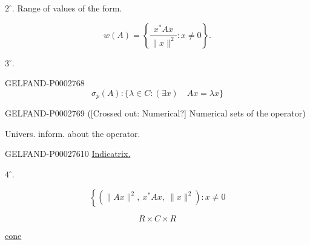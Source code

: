 \par\noindent\begin{minipage}{\linewidth}
$2^{\circ}$. Range of values of the form.

\begin{equation*}w (A)=\left\{\frac{x^*Ax}{\|x\|^2}: x\ne0\right\}.\end{equation*}
\end{minipage}

$3^{\circ}$.

\begin{GelfandAdjacentEvidence}{GELFAND-P000276}{8}
\begin{equation*}\sigma_p (A):\{\lambda\in C: (\exists x)\quad Ax=\lambda x\}\end{equation*}

\end{GelfandAdjacentEvidence}


\begin{GelfandAdjacentEvidence}{GELFAND-P000276}{9}
([Crossed out: Numerical?] Numerical sets of the operator)

\end{GelfandAdjacentEvidence}


Univers. inform. about the operator.

\begin{GelfandAdjacentEvidence}{GELFAND-P000276}{10}
\underline{Indicatrix.}

$4^{\circ}$.

\begin{equation*}\left\{(\|Ax\|^2,\ x^*Ax,\ \|x\|^2): x\ne0\right.\end{equation*}


\begin{equation*}R\times C\times R\end{equation*}

\hfill\underline{\underline{cone}}
\end{GelfandAdjacentEvidence}



